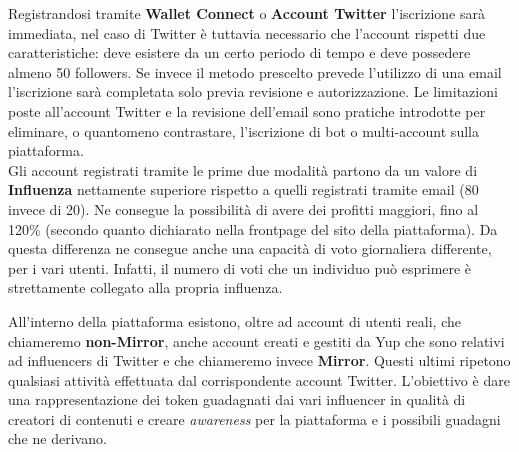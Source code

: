 Registrandosi tramite \textbf{Wallet Connect} o \textbf{Account Twitter} l'iscrizione sarà immediata, nel caso di Twitter è tuttavia necessario che l'account rispetti due caratteristiche: deve esistere da un certo periodo di tempo e deve possedere almeno 50 followers.
Se invece il metodo prescelto prevede l'utilizzo di una email l'iscrizione sarà completata solo previa revisione e autorizzazione. Le limitazioni poste all'account Twitter e la revisione dell'email sono pratiche introdotte per eliminare, o quantomeno contrastare, l'iscrizione di bot o multi-account sulla piattaforma.
\\
Gli account registrati tramite le prime due modalità partono da un valore di \textbf{Influenza} nettamente superiore rispetto a quelli registrati tramite email (80 invece di 20). Ne consegue la possibilità di avere dei profitti maggiori, fino al 120\% (secondo quanto dichiarato nella frontpage del sito della piattaforma). Da questa differenza ne consegue anche una capacità di voto giornaliera differente, per i vari utenti. Infatti, il numero di voti che un individuo può esprimere è strettamente collegato alla propria influenza. %

All'interno della piattaforma esistono, oltre ad account di utenti reali, che chiameremo \textbf{non-Mirror}, anche account creati e gestiti da Yup che sono relativi ad influencers di Twitter e che chiameremo invece \textbf{Mirror}. Questi ultimi ripetono qualsiasi attività effettuata dal corrispondente account Twitter.
L'obiettivo è dare una rappresentazione dei token guadagnati dai vari influencer in qualità di creatori di contenuti e creare \textit{awareness} per la piattaforma e i possibili guadagni che ne derivano.

